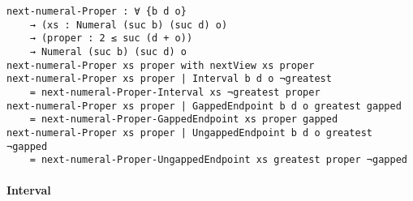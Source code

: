 \documentclass[\main/thesis.tex]{subfiles}
\begin{document}
\begin{lstlisting}[basicstyle=\ttfamily\scriptsize]
next-numeral-Proper : ∀ {b d o}
    → (xs : Numeral (suc b) (suc d) o)
    → (proper : 2 ≤ suc (d + o))
    → Numeral (suc b) (suc d) o
next-numeral-Proper xs proper with nextView xs proper
next-numeral-Proper xs proper | Interval b d o ¬greatest
    = next-numeral-Proper-Interval xs ¬greatest proper
next-numeral-Proper xs proper | GappedEndpoint b d o greatest gapped
    = next-numeral-Proper-GappedEndpoint xs proper gapped
next-numeral-Proper xs proper | UngappedEndpoint b d o greatest ¬gapped
    = next-numeral-Proper-UngappedEndpoint xs greatest proper ¬gapped
\end{lstlisting}

\paragraph{Interval}

\begin{center}
    \begin{adjustbox}{max width=\textwidth}
    \end{adjustbox}
\end{center}
\end{document}
